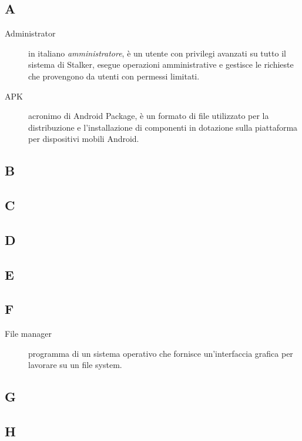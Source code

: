 \documentclass[../../../analisi-dei-requisiti.tex]{subfiles}
\begin{document}
\subsection{A}
\begin{description}
    \item[Administrator] in italiano \textit{amministratore}, è un utente con privilegi avanzati su tutto il sistema di Stalker, esegue operazioni amministrative e gestisce le richieste che provengono da utenti con permessi limitati.
    \item[APK] acronimo di Android Package, è un formato di file utilizzato per la distribuzione e l'installazione di componenti in dotazione sulla piattaforma per dispositivi mobili Android.
\end{description}

\subsection{B}

\subsection{C}

\subsection{D}

\subsection{E}

\subsection{F}
\begin{description}
    \item[File manager] programma di un sistema operativo che fornisce un'interfaccia grafica per lavorare su un file system.
\end{description}

\subsection{G}

\subsection{H}
\end{document}
